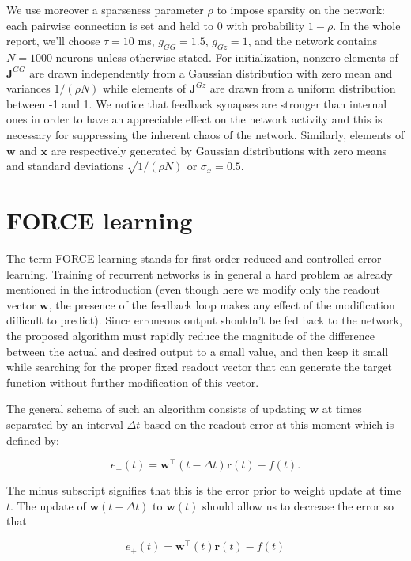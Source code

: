 We use moreover a sparseness parameter $\rho$ to impose sparsity on the 
network: each pairwise connection is set and held to 0 with probability 
$1 - \rho$. In the whole report, we'll choose $\tau=10$ ms, $g_{GG} = 1.5$,
$g_{Gz} = 1$, and the network contains $N=1000$ neurons unless otherwise 
stated. For initialization, nonzero elements of $\mathbf{J}^{GG}$ are drawn
independently from a Gaussian distribution with zero mean and variances
$1/(\rho N)$ while elements of $\mathbf{J}^{Gz}$ are drawn from a uniform
distribution between -1 and 1. We notice that feedback synapses are stronger
than internal ones in order to have an appreciable effect on the
network activity and this is necessary for suppressing the inherent
chaos of the network. Similarly, elements of $\mathbf{w}$ and 
$\mathbf{x}$ are respectively generated by Gaussian distributions with zero 
means and standard deviations $\sqrt{1/(\rho N)}$ or $\sigma_x = 0.5$.


\section{FORCE learning}

The term FORCE learning stands for first-order reduced and controlled error
learning. Training of recurrent networks is in general a hard problem as 
already mentioned in the introduction (even though here we modify only
the readout vector $\mathbf{w}$, the presence of the feedback loop makes
any effect of the modification difficult to predict). Since erroneous output
shouldn't be fed back to the network, the proposed algorithm must rapidly 
reduce the magnitude of the difference between the actual and desired output
to a small value, and then keep it small while searching for the proper
fixed readout vector that can generate the target function without further
modification of this vector.

The general schema of such an algorithm consists of updating $\mathbf{w}$
at times separated by an interval $\Delta t$ based on the readout error
at this moment which is defined by:

\[e_-(t) = \mathbf{w}^{\top}(t-\Delta t)\mathbf{r}(t) - f(t).\]

\noindent
The minus subscript signifies that this is the error prior to weight update 
at time $t$. The update of $\mathbf{w}(t-\Delta t)$ to $\mathbf{w}(t)$ should
allow us to decrease the error so that

\[e_+(t) = \mathbf{w}^{\top}(t)\mathbf{r}(t) - f(t)\]

